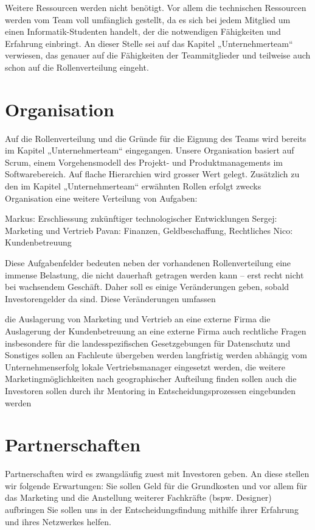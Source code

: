 Weitere Ressourcen werden nicht benötigt. Vor allem die technischen Ressourcen werden vom Team voll umfänglich gestellt, da es sich bei jedem Mitglied um einen Informatik-Studenten handelt, der die notwendigen Fähigkeiten und Erfahrung einbringt. An dieser Stelle sei auf das Kapitel „Unternehmerteam“ verwiesen, das genauer auf die Fähigkeiten der Teammitglieder und teilweise auch schon auf die Rollenverteilung eingeht.


\section{Organisation}
Auf die Rollenverteilung und die Gründe für die Eignung des Teams wird bereits im Kapitel „Unternehmerteam“ eingegangen. Unsere Organisation basiert auf Scrum, einem Vorgehensmodell des Projekt- und Produktmanagements im Softwarebereich. Auf flache Hierarchien wird grosser Wert gelegt. Zusätzlich zu den im Kapitel „Unternehmerteam“ erwähnten Rollen erfolgt zwecks Organisation eine weitere Verteilung von Aufgaben:

Markus: Erschliessung zukünftiger technologischer Entwicklungen
Sergej: Marketing und Vertrieb
Pavan: Finanzen, Geldbeschaffung, Rechtliches
Nico: Kundenbetreuung

Diese Aufgabenfelder bedeuten neben der vorhandenen Rollenverteilung eine immense Belastung, die nicht dauerhaft getragen werden kann – erst recht nicht bei wachsendem Geschäft. Daher soll es einige Veränderungen geben, sobald Investorengelder da sind. Diese Veränderungen umfassen

die Auslagerung von Marketing und Vertrieb an eine externe Firma
die Auslagerung der Kundenbetreuung an eine externe Firma
auch rechtliche Fragen insbesondere für die landesspezifischen Gesetzgebungen für Datenschutz und Sonstiges sollen an Fachleute übergeben werden
langfristig werden abhängig vom Unternehmenserfolg lokale Vertriebsmanager eingesetzt werden, die weitere Marketingmöglichkeiten nach geographischer Aufteilung finden sollen
auch die Investoren sollen durch ihr Mentoring in Entscheidungsprozessen eingebunden werden


\section{Partnerschaften}
Partnerschaften wird es zwangsläufig zuest mit Investoren geben. An diese stellen wir folgende Erwartungen:
Sie sollen Geld für die Grundkosten und vor allem für das Marketing und die Anstellung weiterer Fachkräfte (bspw. Designer) aufbringen
Sie sollen uns in der Entscheidungsfindung mithilfe ihrer Erfahrung und ihres Netzwerkes helfen.

